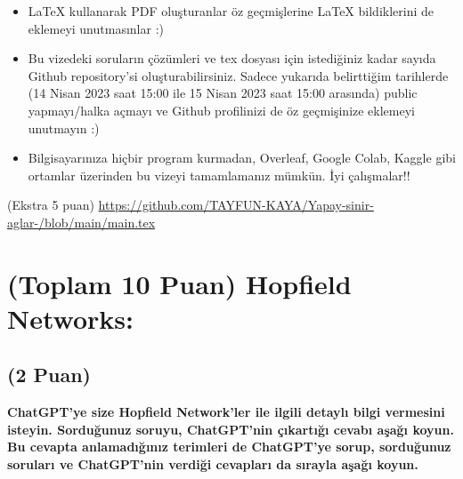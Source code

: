 \documentclass[11pt]{article}
\begin{document}
\begin{itemize}
    \item LaTeX kullanarak PDF oluşturanlar öz geçmişlerine LaTeX bildiklerini de eklemeyi unutmasınlar :)
    \item Bu vizedeki soruların çözümleri ve tex dosyası için istediğiniz kadar sayıda Github repository'si oluşturabilirsiniz. Sadece yukarıda belirttiğim tarihlerde (14 Nisan 2023 saat 15:00 ile 15 Nisan 2023 saat 15:00 arasında) public yapmayı/halka açmayı ve Github profilinizi de öz geçmişinize eklemeyi unutmayın :)
    \item Bilgisayarınıza hiçbir program kurmadan, Overleaf, Google Colab, Kaggle gibi ortamlar üzerinden bu vizeyi tamamlamanız mümkün. İyi çalışmalar!!
\end{itemize}

(Ekstra 5 puan) \url{https://github.com/TAYFUN-KAYA/Yapay-sinir-aglar-/blob/main/main.tex}

\newpage
\section{(Toplam 10 Puan) Hopfield Networks:}

\subsection{(2 Puan)} \textbf{ChatGPT’ye size Hopfield Network’ler ile ilgili detaylı bilgi vermesini isteyin. Sorduğunuz soruyu, ChatGPT'nin çıkartığı cevabı aşağı koyun. Bu cevapta anlamadığınız terimleri de ChatGPT’ye sorup, sorduğunuz soruları ve ChatGPT’nin verdiği cevapları da sırayla aşağı koyun.}
\end{document}
